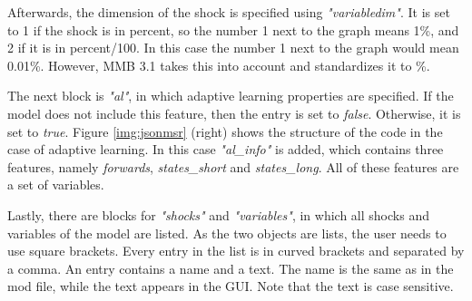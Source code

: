 Afterwards, the dimension of the shock is specified using \textit{"variabledim"}. It is set to 1 if the shock is in percent, so the number 1 next to the graph means 1\%, and 2 if it is in percent/100. In this case the number 1 next to the graph would mean 0.01\%. However, MMB 3.1 takes this into account and standardizes it to \%.  

The next block is \textit{"al"}, in which adaptive learning properties are specified. If the model does not include this feature, then the entry is set to \textit{false}. Otherwise, it is set to \textit{true}. Figure \ref{img:jsonmsr} (right) shows the structure of the code in the case of adaptive learning. In this case \textit{"al\_info"} is added, which contains three features, namely \textit{forwards}, \textit{states\_short} and \textit{states\_long}. All of these features are a set of variables. 

Lastly, there are blocks for \textit{"shocks"} and \textit{"variables"}, in which all shocks and variables of the model are listed. As the two objects are lists, the user needs to use square brackets. Every entry in the list is in curved brackets and separated by a comma. An entry contains a name and a text. The name is the same as in the mod file, while the text appears in the GUI. Note that the text is case sensitive.